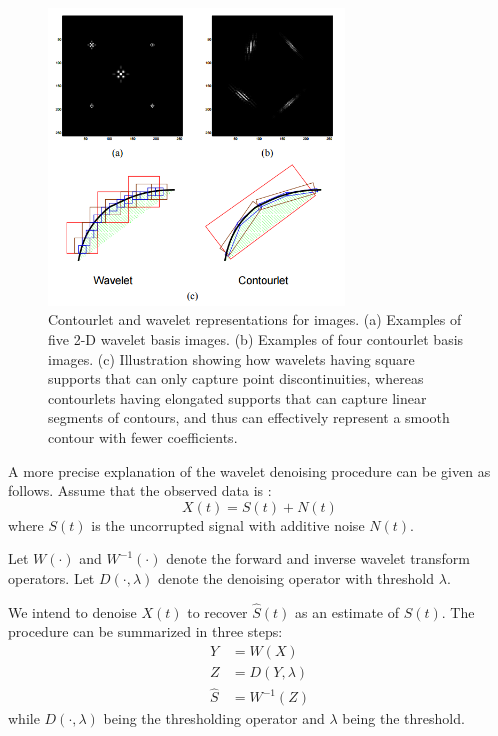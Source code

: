 \begin{figure}[h]
	\centering
	\includegraphics[width=0.7\textwidth]{fig/wavelets_contourlet}
	\caption[PET Denoising - Comparison between Wavelet and Contourlet]{Contourlet and wavelet representations for images. (a) Examples of
		five 2-D wavelet basis images. (b) Examples of four contourlet basis images.
		(c) Illustration showing how wavelets having square supports that can only
		capture point discontinuities, whereas contourlets having elongated supports
		that can capture linear segments of contours, and thus can effectively represent
		a smooth contour with fewer coefficients.
	}
	\label{fig:wavelets_contourlet}
	
\end{figure}

A more precise explanation of the wavelet denoising
procedure can be given as follows. Assume that the
observed data is \cite{rangarajan2002image}:
\begin{equation}
X(t)=S(t)+N(t)
\end{equation}
where $S(t)$ is the uncorrupted signal with additive
noise $N(t)$. 

Let $W(\cdot)$ and $W^{-1}(\cdot)$ denote the forward
and inverse wavelet transform operators. Let $D(\cdot, \lambda)$ denote the denoising operator with threshold $\lambda$. 

We intend to denoise $X(t)$ to recover $\hat{S}(t)$ as an estimate
of $S(t)$. The procedure can be summarized in three
steps:
\begin{subequations}
	\begin{align}
	Y &= W(X)\\
	Z &= D(Y,\lambda)\\
	\hat{S} &= W^{-1}(Z)
	\end{align}
	\label{eqn:wavelet_denoise}
\end{subequations}
while $D(\cdot,\lambda)$ being the thresholding operator and $\lambda$ being the threshold.


